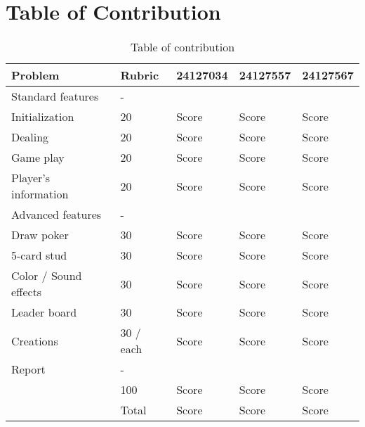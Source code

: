 \section{Table of Contribution}
\label{sec:contribution-section}

\renewcommand{\arraystretch}{1.5} %
\begin{table}[ht]
    \centering
    \begin{tabular}{|m{4cm}|m{2cm}|m{2cm}|m{2cm}| m{2cm}|}
    \hline
    \textbf{Problem} & \textbf{Rubric} & \textbf{24127034} & \textbf{24127557} & \textbf{24127567} \\
    \hline
    Standard features & - &  &  &  \\
    \hline
    Initialization & 20 & Score & Score & Score \\
    \hline
    Dealing & 20 & Score & Score & Score \\
    \hline 
    Game play & 20 & Score & Score & Score \\
    \hline
    Player's information & 20 & Score & Score & Score \\
    \hline
    Advanced features & - &  &  &  \\
    \hline 
    Draw poker & 30 & Score & Score & Score \\
    \hline
    5-card stud & 30 & Score & Score & Score \\
    \hline
    Color / Sound effects & 30 & Score & Score & Score \\
    \hline
    Leader board & 30 & Score & Score & Score \\
    \hline
    Creations & 30 / each & Score & Score & Score \\
    \hline
    Report & - &  &  &  \\
    \hline
     & 100 & Score & Score & Score \\
    \hline
    & Total & Score & Score & Score \\
    \hline
    \end{tabular}
    \caption{Table of contribution}
    \label{tab:contribution-table}

\end{table}